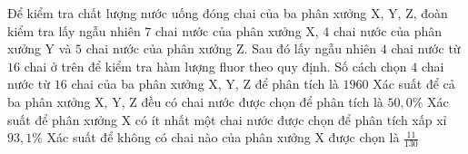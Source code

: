 \begin{ex}Để kiểm tra chất lượng nước uống đóng chai của ba phân xưởng X, Y, Z, đoàn kiểm tra lấy ngẫu nhiên $7$ chai nước của phân xưởng X, $4$ chai nước của phân xưởng Y và $5$ chai nước của phân xưởng Z. Sau đó lấy ngẫu nhiên $4$ chai nước từ $16$ chai ở trên để kiểm tra hàm lượng fluor theo quy định.
    \choiceTF
    {Số cách chọn $4$ chai nước từ $16$ chai của ba phân xưởng X, Y, Z để phân tích là $1960$}
    {\True Xác suất để cả ba phân xưởng X, Y, Z đều có chai nước được chọn để phân tích là $50,0\%$}
    {\True Xác suất để phân xưởng X có ít nhất một chai nước được chọn để phân tích xấp xỉ $93,1\%$}
    {Xác suất để không có chai nào của phân xưởng X được chọn là $\frac{11}{130}$}
\end{ex}
